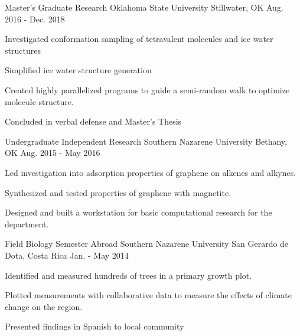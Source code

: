 

\begin{cventries}
	\vspace{-1mm}

  \cventry
    {Master's Graduate Research} %
    {Oklahoma State University} %
    {Stillwater, OK} %
    {Aug. 2016 - Dec. 2018} %
    {
      \begin{cvitems} %
        \item{Investigated conformation sampling of tetravalent molecules and ice water structures}
        \item{Simplified ice water structure generation}
        \item{Created highly parallelized programs to guide a semi-random walk to optimize molecule structure.}
        \item{Concluded in verbal defense and Master's Thesis}
		\vspace{-2mm}
      \end{cvitems}
    }

\cventry
{Undergraduate Independent Research} %
{Southern Nazarene University} %
{Bethany, OK} %
{Aug. 2015 - May 2016} %
{
	\begin{cvitems} %
		\item{Led investigation into adsorption properties of graphene on alkenes and alkynes.}
		\item{Synthesized and tested properties of graphene with magnetite.}
		\item{Designed and built a workstation for basic computational research for the department.}
		\vspace{-3.5mm}
	\end{cvitems}
}

\cventry
{Field Biology Semester Abroad} %
{Southern Nazarene University} %
{San Gerardo de Dota, Costa Rica} %
{Jan. - May 2014} %
{
	\begin{cvitems} %
		\item{Identified and measured hundreds of trees in a primary growth plot.}
		\item{Plotted measurements with collaborative data to measure the effects of climate change on the region.}
		\item{Presented findings in Spanish to local community}
		\vspace{-2.5mm}
	\end{cvitems}
}


\end{cventries}
